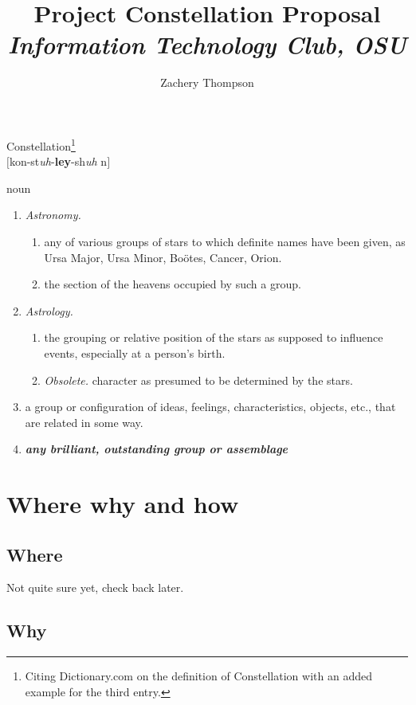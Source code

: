 \documentclass[12pt]{article}
\title{
\textbf{Project Constellation Proposal}
\\
\textit{Information Technology Club, OSU}
}
\author{Zachery Thompson}
\begin{document}
\maketitle{}
\clearpage{}

\begin{center}
\LARGE{Constellation}\footnote{Citing Dictionary.com on the definition of Constellation with an added example for the third entry.}
\\
\large{$[$kon-st\textit{uh}-\textbf{ley}-sh\textit{uh} n$]$}
\\
\end{center}
noun
\begin{enumerate}
    \item \textit{Astronomy.}
    \begin{enumerate}
        \item any of various groups of stars to which definite names have been given, as Ursa Major, Ursa Minor, Bo\"{o}tes, Cancer, Orion.
        \item the section of the heavens occupied by such a group.
    \end{enumerate}
    \item \textit{Astrology.}
    \begin{enumerate}
        \item the grouping or relative position of the stars as supposed to influence events, especially at a person's birth.
        \item \textit{Obsolete.} character as presumed to be determined by the stars.
    \end{enumerate}
    \item a group or configuration of ideas, feelings, characteristics, objects, etc., that are related in some way.
    \item \textbf{\textit{any brilliant, outstanding group or assemblage}}
\end{enumerate}
\clearpage{}

\section{Where why and how}

\subsection{Where}

Not quite sure yet, check back later.

\subsection{Why}
\end{document}
